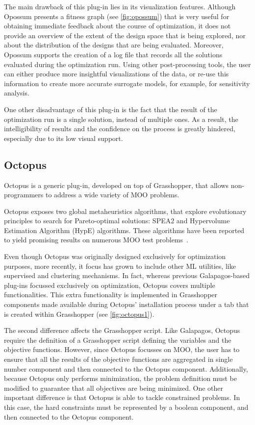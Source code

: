 	The main drawback of this plug-in lies in its visualization features. Although Opossum presents a fitness graph (see \cref{fig:opossum}) that is very useful for obtaining immediate feedback about the course of optimization, it does not provide an overview of the extent of the design space that is being explored, nor about the distribution of the designs that are being evaluated. Moreover, Opossum supports the creation of a log file that records all the solutions evaluated during the optimization run. Using other post-processing tools, the user can either produce more insightful visualizations of the data, or re-use this information to create more accurate surrogate models, for example, for sensitivity analysis.
	
	One other disadvantage of this plug-in is the fact that the result of the optimization run is a single solution, instead of multiple ones. As a result, the intelligibility of results and the confidence on the process is greatly hindered, especially due to its low visual support. 
	
	\subsection{Octopus}
	
	Octopus \cite{OCTOPUS} is a generic plug-in, developed on top of Grasshopper, that allows non-programmers to address a wide variety of \ac{MOO} problems. 
	
	Octopus exposes two global metaheuristics algorithms, that explore evolutionary principles to search for Pareto-optimal solutions: \ac{SPEA2} and Hypervolume Estimation Algorithm (HypE) algorithms. These algorithms have been reported to yield promising results on numerous \ac{MOO} test problems~\cite{Zitzler2001SPEA2,Zitzler2011HypE}. 
	
	Even though Octopus was originally designed exclusively for optimization purposes, more recently, it focus has grown to include other \ac{ML} utilities, like supervised and clustering mechanisms. In fact, whereas previous Galapagos-based plug-ins focussed exclusively on optimization, Octopus covers multiple functionalities. This extra functionality is implemented in Grasshopper components made available during Octopus' installation process under a tab that is created within Grasshopper (see \cref{fig:octopus1}).
	
	The second difference affects the Grasshopper script. Like Galapagos, Octopus require the definition of a Grasshopper script defining the variables and the objective functions. However, since Octopus focusses on \ac{MOO}, the user has to ensure that all the results of the objective functions are aggregated in single number component and then connected to the Octopus component. Additionally, because Octopus only performs minimization, the problem definition must be modified to guarantee that all objectives are being minimized. One other important difference is that Octopus is able to tackle constrained problems. In this case, the hard constraints must be represented by a boolean component, and then connected to the Octopus component.
	
